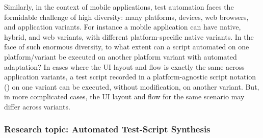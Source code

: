 Similarly, in the context of mobile applications, test automation faces the
formidable challenge of high diversity: many platforms, devices, web browsers,
and application variants. For instance a mobile application can have native,
hybrid, and web variants, with different platform-specific native variants. In
the face of such enormous diversity, to what extent can a script automated on
one platform/variant be executed on another platform variant with automated
adaptation?  In cases where the UI layout and flow is exactly the same across
application variants, a test script recorded in a platform-agnostic script
notation (\eg \cite{PerfectoScriptOnce}) on one variant can be executed, without
modification, on another variant.  But, in more complicated cases, the UI layout
and flow for the same scenario may differ across variants.




\subsubsection*{Research topic: Automated Test-Script Synthesis}

